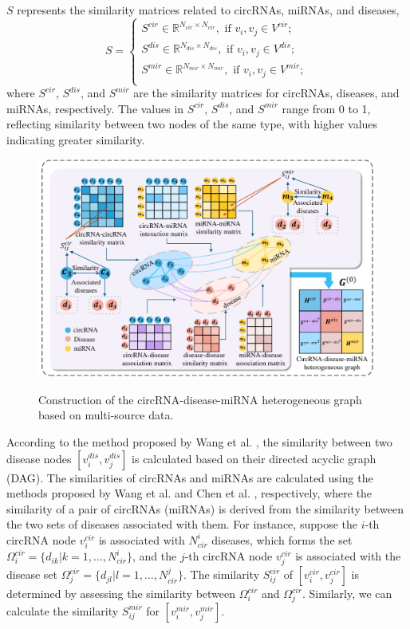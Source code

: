 \documentclass[journal=jcisd8,manuscript=article]{achemso}
\begin{document}
$S$ represents the similarity matrices related to circRNAs, miRNAs, and diseases,
\begin{equation}
S = \left\{ \begin{array}{l}
{S^{cir}} \in {\mathbb{R}^{N_{cir}\times N_{cir}}}, \text{ if } {v_i},{v_j} \in {V^{cir}};\\[5pt]
{S^{dis}} \in {\mathbb{R}^{N_{dis}\times N_{dis}}}, \text{ if } {v_i},{v_j} \in {V^{dis}};\\[5pt]
{S^{mir}} \in {\mathbb{R}^{N_{mir}\times N_{mir}}}, \text{ if } {v_i},{v_j} \in {V^{mir}};\\
\end{array} \right.
\end{equation}
where $S^{cir}$, $S^{dis}$, and $S^{mir}$ are the similarity matrices for circRNAs, diseases, and miRNAs, respectively. The values in $S^{cir}$, $S^{dis}$, and $S^{mir}$ range from 0 to 1, reflecting similarity between two nodes of the same type, with higher values indicating greater similarity.

\begin{figure}
    \centering
    \includegraphics[width=6in]{fig/visio2.pdf}\\       
	\caption{Construction of the circRNA-disease-miRNA heterogeneous graph based on multi-source data.}
    \label{fig:visio2}
\end{figure}

According to the method proposed by Wang et al. \cite{wang2010inferring}, the similarity between two disease nodes $[v_i^{dis},v_j^{dis}]$ is calculated based on their directed acyclic graph (DAG). The similarities of circRNAs and miRNAs are calculated using the methods proposed by Wang et al. \cite{wang2010inferring} and Chen et al. \cite{chen2015constructing}, respectively, where the similarity of a pair of circRNAs (miRNAs) is derived from the similarity between the two sets of diseases associated with them. For instance, suppose the $i$-th circRNA node $v_i^{cir}$ is associated with $N_{cir}^i$ diseases, which forms the set $\Omega_i^{cir} = \{d_{ik} | k = 1, \ldots, N_{cir}^i\}$, and the $j$-th circRNA node $v_j^{cir}$ is associated with the disease set $\Omega_j^{cir} = \{d_{jl} | l = 1, \ldots, N_{cir}^j\}$. The similarity $S_{ij}^{cir}$ of $[v_i^{cir},v_j^{cir}]$ is determined by assessing the similarity between $\Omega_i^{cir}$ and $\Omega_j^{cir}$. Similarly, we can calculate the similarity $S_{ij}^{mir}$ for $[v_i^{mir},v_j^{mir}]$.
\end{document}
